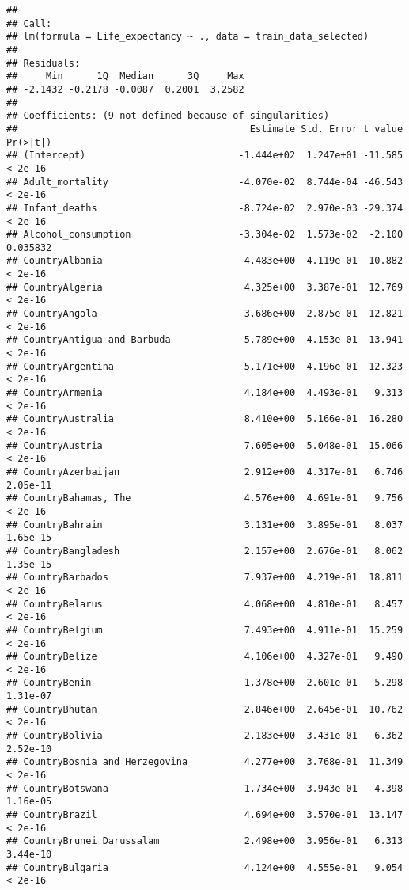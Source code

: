 \documentclass[
]{article}
\begin{document}
\begin{verbatim}
## 
## Call:
## lm(formula = Life_expectancy ~ ., data = train_data_selected)
## 
## Residuals:
##     Min      1Q  Median      3Q     Max 
## -2.1432 -0.2178 -0.0087  0.2001  3.2582 
## 
## Coefficients: (9 not defined because of singularities)
##                                         Estimate Std. Error t value Pr(>|t|)
## (Intercept)                           -1.444e+02  1.247e+01 -11.585  < 2e-16
## Adult_mortality                       -4.070e-02  8.744e-04 -46.543  < 2e-16
## Infant_deaths                         -8.724e-02  2.970e-03 -29.374  < 2e-16
## Alcohol_consumption                   -3.304e-02  1.573e-02  -2.100 0.035832
## CountryAlbania                         4.483e+00  4.119e-01  10.882  < 2e-16
## CountryAlgeria                         4.325e+00  3.387e-01  12.769  < 2e-16
## CountryAngola                         -3.686e+00  2.875e-01 -12.821  < 2e-16
## CountryAntigua and Barbuda             5.789e+00  4.153e-01  13.941  < 2e-16
## CountryArgentina                       5.171e+00  4.196e-01  12.323  < 2e-16
## CountryArmenia                         4.184e+00  4.493e-01   9.313  < 2e-16
## CountryAustralia                       8.410e+00  5.166e-01  16.280  < 2e-16
## CountryAustria                         7.605e+00  5.048e-01  15.066  < 2e-16
## CountryAzerbaijan                      2.912e+00  4.317e-01   6.746 2.05e-11
## CountryBahamas, The                    4.576e+00  4.691e-01   9.756  < 2e-16
## CountryBahrain                         3.131e+00  3.895e-01   8.037 1.65e-15
## CountryBangladesh                      2.157e+00  2.676e-01   8.062 1.35e-15
## CountryBarbados                        7.937e+00  4.219e-01  18.811  < 2e-16
## CountryBelarus                         4.068e+00  4.810e-01   8.457  < 2e-16
## CountryBelgium                         7.493e+00  4.911e-01  15.259  < 2e-16
## CountryBelize                          4.106e+00  4.327e-01   9.490  < 2e-16
## CountryBenin                          -1.378e+00  2.601e-01  -5.298 1.31e-07
## CountryBhutan                          2.846e+00  2.645e-01  10.762  < 2e-16
## CountryBolivia                         2.183e+00  3.431e-01   6.362 2.52e-10
## CountryBosnia and Herzegovina          4.277e+00  3.768e-01  11.349  < 2e-16
## CountryBotswana                        1.734e+00  3.943e-01   4.398 1.16e-05
## CountryBrazil                          4.694e+00  3.570e-01  13.147  < 2e-16
## CountryBrunei Darussalam               2.498e+00  3.956e-01   6.313 3.44e-10
## CountryBulgaria                        4.124e+00  4.555e-01   9.054  < 2e-16

\end{verbatim}
\end{document}
